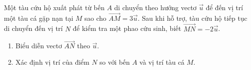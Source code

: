\begin{ex}%
	Một tàu cứu hộ xuất phát từ bến $A$ di chuyển theo hướng vectơ $\overrightarrow{u}$ để đến vị trí một tàu cá gặp nạn tại $M$ sao cho $\overrightarrow{AM} = 3\overrightarrow{u}$. Sau khi hỗ trợ, tàu cứu hộ tiếp tục di chuyển đến vị trí $N$ để kiểm tra một phao cứu sinh, biết $\overrightarrow{MN} = -2\overrightarrow{u}$.
	\begin{enumerate}
		\item Biểu diễn vectơ $\overrightarrow{AN}$ theo $\overrightarrow{u}$.
		\item Xác định vị trí của điểm $N$ so với bến $A$ và vị trí tàu cá $M$.
	\end{enumerate}
\end{ex}
